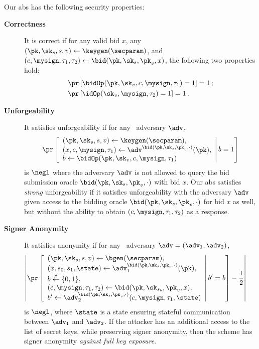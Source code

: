 Our \gls{abs} has the following security properties:
\begin{description}
	\item[\textbf{Correctness}]
	It is correct if for any valid bid $x$, any $(\pk,\sk_s, s, v) \gets \keygen(\secparam)$, and $(c, \mysign,\tau_1, \tau_2) \gets \bid(\pk,\sk_s,\pk_v, x)$, the following two properties hold:
	  \begin{align*}
	    &\pr\left[\bidOp(\pk,\sk_v,c,\mysign,\tau_1)=1 \right] = 1 \,;\\
	    &\pr\left[\idOp(\sk_v,\mysign,\tau_2)=1 \right] = 1 \,.
	  \end{align*}

	\item[\textbf{Unforgeability}]
	It satisfies unforgeability if for any \ppt ~adversary $\adv$,
	\begin{equation*}
		\pr\left[\begin{array}{l}
	      (\pk,\sk_s, s, v) \gets \keygen(\secparam),\\
	      (x,c,\mysign,\tau_1) \gets \adv^{\bid(\pk,\sk_s,\pk_v,\cdot)}(\pk),\\
	      b \gets \bidOp(\pk,\sk_v,c,\mysign,\tau_1)
	    \end{array}\middle\vert\,  b=1 \right]	
	\end{equation*}
	is $\negl$ where the adversary $\adv$ is not allowed to query the bid submission oracle $\bid(\pk, \sk_s, \pk_v,\cdot)$ with bid $x$. Our \gls{abs} satisfies \textit{strong} unforgeability if it satisfies unforgeability with the adversary $\adv$ given access to the bidding oracle $\bid(\pk, \sk_s, \pk_v,\cdot)$ for bid $x$ as well, but without the ability to obtain $(c,\mysign,\tau_1, \tau_2)$ as a response.

	\item[\textbf{Signer Anonymity}]
	It satisfies anonymity if for any \ppt ~adversary $\adv=(\adv_1,\adv_2)$,
	\begin{equation*}
		\hspace*{-.5cm}
		\left|\pr\left[\begin{array}{l}
	        (\pk,\sk_s, s,v) \gets \bgen(\secparam),\\
	        (x,s_0,s_1,\state) \gets \adv_1^{\bid(\pk,\sk_s,\pk_v,\cdot)}(\pk),\\
	        b \overset{\$}{\leftarrow} \{0,1\},\\
	        (c,\mysign,\tau_1,\tau_2) \gets \bid(\pk,\sk_{s_b},\pk_v,x),\\
	        b' \gets \adv_2^{\bid(\pk,\sk_s,\pk_v,\cdot)}(c,\mysign,\tau_1,
	        \state)
	      \end{array}\middle\vert\,  b'=b \right] - \frac{1}{2}\right|	
	\end{equation*}
	is $\negl$, where $\state$ is a state ensuring stateful communication between $\adv_1$ and $\adv_2$. If the attacker has an additional access to the list of secret keys, while preserving signer anonymity, then the scheme has signer anonymity \textit{against full key exposure}.


\end{description}

